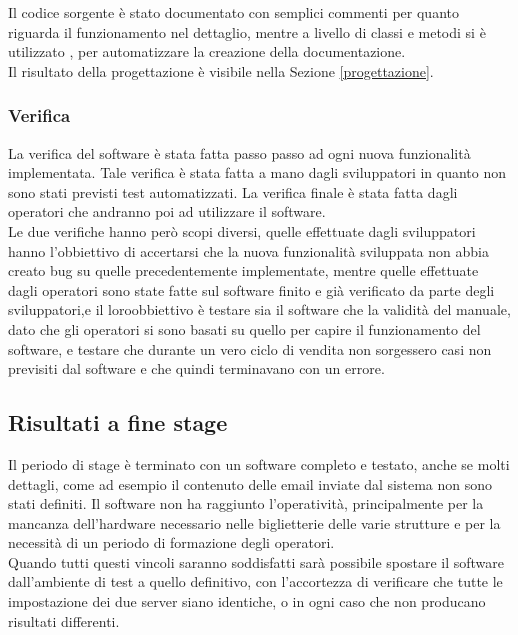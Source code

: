Il codice sorgente è stato documentato con semplici commenti per quanto riguarda il funzionamento nel dettaglio, mentre a livello di classi e metodi si è utilizzato , per automatizzare la creazione della documentazione. \\

Il risultato della progettazione è visibile nella Sezione \ref{progettazione}.

\subsubsection{Verifica}
La verifica del software è stata fatta passo passo ad ogni nuova funzionalità implementata. Tale verifica è stata fatta a mano dagli sviluppatori in quanto non sono stati previsti test automatizzati. La verifica finale è stata fatta dagli operatori che andranno poi ad utilizzare il software. \\

Le due verifiche hanno però scopi diversi, quelle effettuate dagli sviluppatori hanno l'obbiettivo di accertarsi che la nuova funzionalità sviluppata non abbia creato bug su quelle precedentemente implementate, mentre quelle effettuate dagli operatori sono state fatte sul software finito e già verificato da parte degli sviluppatori,e il loroobbiettivo è testare sia il software che la validità del manuale, dato che gli operatori si sono basati su quello per capire il funzionamento del software, e testare che durante un vero ciclo di vendita non sorgessero casi non previsiti dal software e che quindi terminavano con un errore. 


\subsection{Risultati a fine stage}
Il periodo di stage è terminato con un software completo e testato, anche se molti dettagli, come ad esempio il contenuto delle email inviate dal sistema non sono stati definiti.
Il software non ha raggiunto l'operatività, principalmente per la mancanza dell'hardware necessario nelle biglietterie delle varie strutture e per la necessità di un periodo di formazione degli operatori. \\

Quando tutti questi vincoli saranno soddisfatti sarà possibile spostare il software dall'ambiente di test a quello definitivo, con l'accortezza di verificare che tutte le impostazione dei due server siano identiche, o in ogni caso che non producano risultati differenti.

